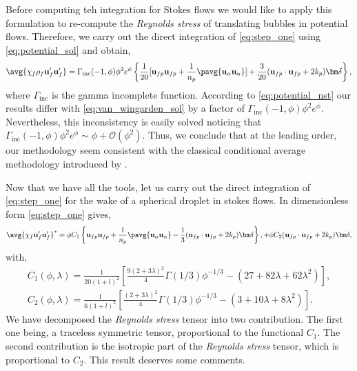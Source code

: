 Before computing teh integration for Stokes flows we would like to apply this formulation to re-compute the \textit{Reynolds stress} of translating bubbles in potential flows. 
Therefore, we carry out the direct integration of \ref{eq:step_one} using \ref{eq:potential_sol} and obtain, 
\begin{equation}
    \avg{\chi_f \rho_f \textbf{u}_f'\textbf{u}_f'}
    = \Gamma_\text{inc}(-1,\phi)\phi^2 e^\phi \left\{
        \frac{1}{20}[\textbf{u}_{fp}\textbf{u}_{fp}+ \frac{1}{n_p}\pavg{\textbf{u}_\alpha\textbf{u}_\alpha}]
        + 
        \frac{3}{20} (\textbf{u}_{fp}\cdot \textbf{u}_{fp} + 2k_p)\bm\delta
    \right\},
    \label{eq:potential_nst}
\end{equation}
where $\Gamma_\text{inc}$ is the gamma incomplete function. 
According to \ref{eq:potential_nst} our results differ with \ref{eq:van_wingarden_sol} by a factor of $\Gamma_\text{inc}(-1,\phi)\phi^2 e^\phi$. 
Nevertheless, this inconsistency is easily solved noticing that $\Gamma_\text{inc}(-1,\phi)\phi^2 e^\phi \sim \phi + \mathcal{O}(\phi^2)$. 
Thus, we conclude that at the leading order, our methodology seem consistent with the classical conditional average methodology introduced by \citet{batchelor1972sedimentation}. 

Now that we have all the tools, let us carry out the direct integration of \ref{eq:step_one} for the wake of a spherical droplet in stokes flows. 
In dimensionless form \ref{eq:step_one} gives, 
\begin{equation}
    \avg{\chi_f  \textbf{u}_f'\textbf{u}_f'}^*
    = \phi    
    C_1
    \left\{
        \textbf{u}_{fp}\textbf{u}_{fp}+ \frac{1}{n_p}\pavg{\textbf{u}_\alpha\textbf{u}_\alpha}
        -\frac{1}{3} (\textbf{u}_{fp}\cdot \textbf{u}_{fp} + 2k_p)\bm\delta
    \right\},    
    + \phi C_2
    (\textbf{u}_{fp}\cdot \textbf{u}_{fp} + 2k_p)\bm\delta,
    \label{eq:final_closure}
\end{equation}
with,
\begin{align*}
    C_1(\phi,\lambda)
    = \frac{1}{20(1+l)^2}\left[
        \frac{9(2+3\lambda)^2}{4}\Gamma(1/3) \phi^{-1/3}
        - (27+82\lambda +62\lambda^2)
    \right],\\
    C_2(\phi,\lambda)
    = \frac{1}{6(1+l)^2}\left[
        \frac{(2+3\lambda)^2}{4}\Gamma(1/3) \phi^{-1/3}
        - (3+10\lambda +8\lambda^2)
    \right].
\end{align*}
We have decomposed the \textit{Reynolds stress} tensor into two contribution. 
The first one being, a traceless symmetric tensor, proportional to the functional $C_1$. 
The second contribution is the isotropic part of the \textit{Reynolds stress} tensor, which is proportional to $C_2$. 
This result deserves some comments. 

